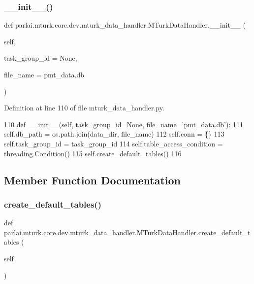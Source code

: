 \subsubsection{\texorpdfstring{\+\_\+\+\_\+init\+\_\+\+\_\+()}{\_\_init\_\_()}}
{\footnotesize\ttfamily def parlai.\+mturk.\+core.\+dev.\+mturk\+\_\+data\+\_\+handler.\+M\+Turk\+Data\+Handler.\+\_\+\+\_\+init\+\_\+\+\_\+ (\begin{DoxyParamCaption}\item[{}]{self,  }\item[{}]{task\+\_\+group\+\_\+id = {\ttfamily None},  }\item[{}]{file\+\_\+name = {\ttfamily \textquotesingle{}pmt\+\_\+data.db\textquotesingle{}} }\end{DoxyParamCaption})}



Definition at line 110 of file mturk\+\_\+data\+\_\+handler.\+py.


\begin{DoxyCode}
110     \textcolor{keyword}{def }\_\_init\_\_(self, task\_group\_id=None, file\_name='pmt\_data.db'):
111         self.db\_path = os.path.join(data\_dir, file\_name)
112         self.conn = \{\}
113         self.task\_group\_id = task\_group\_id
114         self.table\_access\_condition = threading.Condition()
115         self.create\_default\_tables()
116 
\end{DoxyCode}


\subsection{Member Function Documentation}
\mbox{\label{classparlai_1_1mturk_1_1core_1_1dev_1_1mturk__data__handler_1_1MTurkDataHandler_a08e9ad4daabe8117c158b0c2a986f6f1}} 
\subsubsection{\texorpdfstring{create\+\_\+default\+\_\+tables()}{create\_default\_tables()}}
{\footnotesize\ttfamily def parlai.\+mturk.\+core.\+dev.\+mturk\+\_\+data\+\_\+handler.\+M\+Turk\+Data\+Handler.\+create\+\_\+default\+\_\+tables (\begin{DoxyParamCaption}\item[{}]{self }\end{DoxyParamCaption})}

